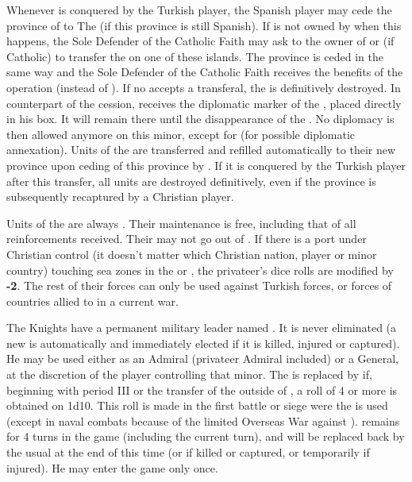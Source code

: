 \label{chSpecific:Knights:Transfer}
Whenever  is conquered by the Turkish player, the
Spanish player may cede the province of  to The
 (if this province is still Spanish).
\bparag If  is not owned by \SPA when this happens, the
Sole Defender of the Catholic Faith may ask to the owner of
 or  (if Catholic) to transfer the
 on one of these islands. The province is ceded in the
same way and the Sole Defender of the Catholic Faith receives the
benefits of the operation (instead of \SPA). If no \MAJ accepts a
transferal, the  is definitively destroyed.
\bparag In counterpart of the cession, \SPA receives the diplomatic
marker of the , placed directly in his \VASSAL box. It
will remain there until the disappearance of the . No
diplomacy is then allowed anymore on this minor, except for \SPA (for
possible diplomatic annexation).
\bparag Units of the  are transferred and refilled
automatically to their new province upon ceding of this province by
\SPA.
\bparag If it is conquered by the Turkish player after this transfer,
all  units are destroyed definitively, even if the
province is subsequently recaptured by a Christian player.

\bparag
Units of the  are always . Their
maintenance is free, including that of all reinforcements received.
\bparag Their \corsaire may not go out of . If
there is a port under Christian control (it doesn't matter which
Christian nation, player or minor country) touching sea zones in the
 or , the privateer's dice rolls
are modified by {\bf -2}.
\bparag The rest of their forces can only be used against Turkish forces,
or forces of countries allied to \TUR in a current war.

\label{chSpecific:Grand Master}
The Knights have a permanent military leader named . It is never eliminated (a new  is
automatically and immediately elected if it is killed, injured or
captured).  He may be used either as an Admiral (privateer Admiral
included) or a General, at the discretion of the player controlling that
minor.
\bparag[La Valette]\label{chSpecific:La Valette}
The  is replaced by  if,
beginning with period III or the transfer of the 
outside of , a roll of 4 or more is obtained on
1d10. This roll is made in the first battle or siege were the
 is used (except in naval combats because of the
limited Overseas War against \TUR).  remains for 4
turns in the game (including the current turn), and will be replaced
back by the usual  at the end of this time (or if
killed or captured, or temporarily if injured). He may enter the game
only once.

